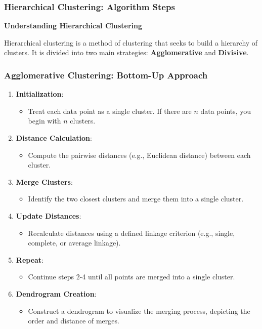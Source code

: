 \documentclass[aspectratio=169]{beamer}
\begin{document}
\begin{frame}[fragile]
    \frametitle{Hierarchical Clustering: Algorithm Steps}
    \textbf{Understanding Hierarchical Clustering}
    
    Hierarchical clustering is a method of clustering that seeks to build a hierarchy of clusters. 
    It is divided into two main strategies: \textbf{Agglomerative} and \textbf{Divisive}.
\end{frame}

\begin{frame}[fragile]
    \frametitle{Agglomerative Clustering: Bottom-Up Approach}
    \begin{enumerate}
        \item \textbf{Initialization}:
        \begin{itemize}
            \item Treat each data point as a single cluster. If there are \( n \) data points, you begin with \( n \) clusters.
        \end{itemize}
        
        \item \textbf{Distance Calculation}:
        \begin{itemize}
            \item Compute the pairwise distances (e.g., Euclidean distance) between each cluster.
        \end{itemize}

        \item \textbf{Merge Clusters}:
        \begin{itemize}
            \item Identify the two closest clusters and merge them into a single cluster.
        \end{itemize}

        \item \textbf{Update Distances}:
        \begin{itemize}
            \item Recalculate distances using a defined linkage criterion (e.g., single, complete, or average linkage).
        \end{itemize}

        \item \textbf{Repeat}:
        \begin{itemize}
            \item Continue steps 2-4 until all points are merged into a single cluster.
        \end{itemize}

        \item \textbf{Dendrogram Creation}:
        \begin{itemize}
            \item Construct a dendrogram to visualize the merging process, depicting the order and distance of merges.
        \end{itemize}
    \end{enumerate}
\end{frame}
\end{document}
